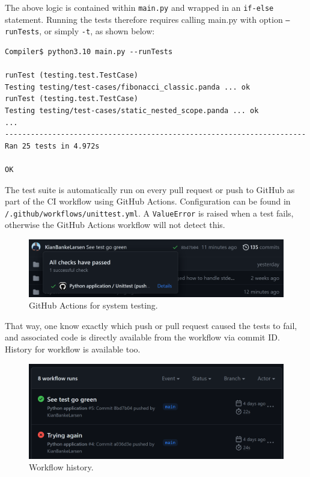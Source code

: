The above logic is contained within \texttt{main.py} and wrapped in an \texttt{if-else} statement. Running the tests therefore requires calling main.py with option \texttt{--runTests}, or simply \texttt{-t}, as shown below:

\begin{verbatim}
Compiler$ python3.10 main.py --runTests

runTest (testing.test.TestCase)
Testing testing/test-cases/fibonacci_classic.panda ... ok
runTest (testing.test.TestCase)
Testing testing/test-cases/static_nested_scope.panda ... ok
...
----------------------------------------------------------------------
Ran 25 tests in 4.972s

OK 
\end{verbatim}

The test suite is automatically run on every pull request or push to GitHub as part of the CI workflow using GitHub Actions. Configuration can be found in \texttt{/.github/workflows/unittest.yml}. A \texttt{ValueError} is raised when a test fails, otherwise the GitHub Actions workflow will not detect this.

\begin{figure}[H]
    \centering
    \includegraphics[width=1\textwidth]{misc/images/GitHub_Actions.png}
    \caption{GitHub Actions for system testing.}
\end{figure}

That way, one know exactly which push or pull request caused the tests to fail, and associated code is directly available from the workflow via commit ID. History for workflow is available too.

\begin{figure}[H]
    \centering
    \includegraphics[width=1\textwidth]{misc/images/Workflow.png}
    \caption{Workflow history.}
\end{figure}

